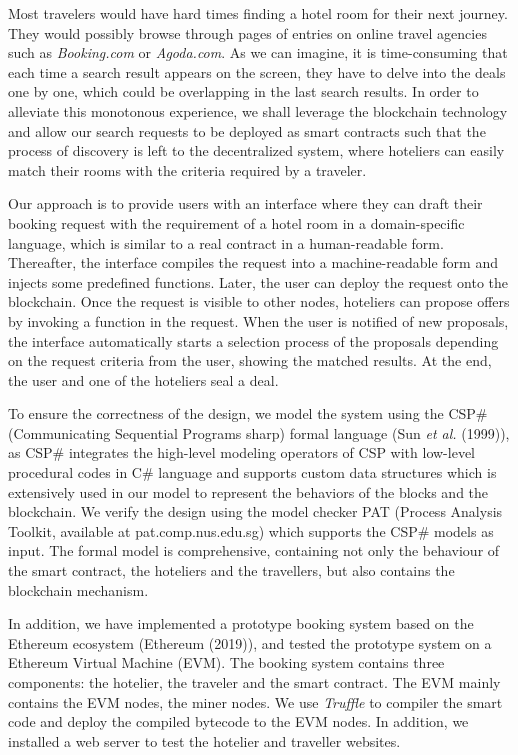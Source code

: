 \documentclass{KERauth}
\begin{document}
Most travelers would have hard times finding a hotel room for their next journey. They would possibly
browse through pages of entries on online travel agencies such as \emph{Booking.com} or \emph{Agoda.com}. As
we can imagine, it is time-consuming that each time a search result appears on the screen, they have to
delve into the deals one by one, which could be overlapping in the last search results. In order to alleviate
this monotonous experience, we shall leverage the blockchain technology and allow our search requests to
be deployed as smart contracts such that the process of discovery is left to the decentralized system, where
hoteliers can easily match their rooms with the criteria required by a traveler.

Our approach is to provide users with an interface where they can draft their booking request with the
requirement of a hotel room in a domain-specific language, which is similar to a real contract in a human-readable form. Thereafter, the interface compiles the request into a machine-readable form and injects some
predefined functions. Later, the user can deploy the request onto the blockchain. Once the request is visible
to other nodes, hoteliers can propose offers by invoking a function in the request. When the user is notified
of new proposals, the interface automatically starts a selection process of the proposals depending on the
request criteria from the user, showing the matched results. At the end, the user and one of the hoteliers seal
a deal.

To ensure the correctness of the design, we model the system using the CSP\# (Communicating Sequential Programs sharp) formal language (Sun {\it et al.} (1999)), as CSP\# integrates the high-level modeling operators of CSP with low-level procedural codes in C\# language and supports custom data structures which is extensively used in our model to represent the behaviors of the blocks and the blockchain. We verify the design using the model checker PAT (Process Analysis Toolkit, available at pat.comp.nus.edu.sg) which supports the CSP\# models as input. The formal model is comprehensive, containing not only the behaviour of the smart contract, the hoteliers and the travellers, but also contains the blockchain mechanism.

In addition, we have implemented a prototype booking system based on the Ethereum ecosystem (Ethereum (2019)), and tested the prototype system on a Ethereum Virtual Machine (EVM). The booking system contains three components: the hotelier, the traveler and the smart contract. The EVM mainly contains the EVM nodes, the miner nodes. We use \emph{Truffle} to compiler the smart code and deploy the compiled bytecode to the EVM nodes. In addition, we installed a web server to test the hotelier and traveller websites.
\end{document}
